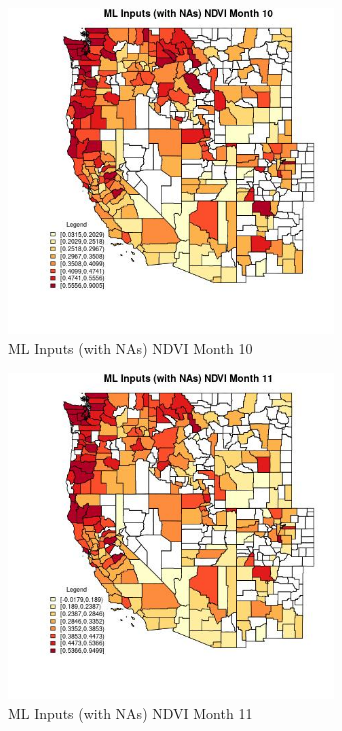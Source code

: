 \begin{figure} 
\centering  
\includegraphics[width=0.77\textwidth]{Code_Outputs/Report_ML_input_PM25_Step4_part_f_de_duplicated_aves_prioritize_24hr_obswNAs_CountyNDVImedianMonth10.jpg} 
\caption{\label{fig:Report_ML_input_PM25_Step4_part_f_de_duplicated_aves_prioritize_24hr_obswNAsCountyNDVImedianMonth10}ML Inputs (with NAs) NDVI Month 10} 
\end{figure} 
 

\begin{figure} 
\centering  
\includegraphics[width=0.77\textwidth]{Code_Outputs/Report_ML_input_PM25_Step4_part_f_de_duplicated_aves_prioritize_24hr_obswNAs_CountyNDVImedianMonth11.jpg} 
\caption{\label{fig:Report_ML_input_PM25_Step4_part_f_de_duplicated_aves_prioritize_24hr_obswNAsCountyNDVImedianMonth11}ML Inputs (with NAs) NDVI Month 11} 
\end{figure} 
 

